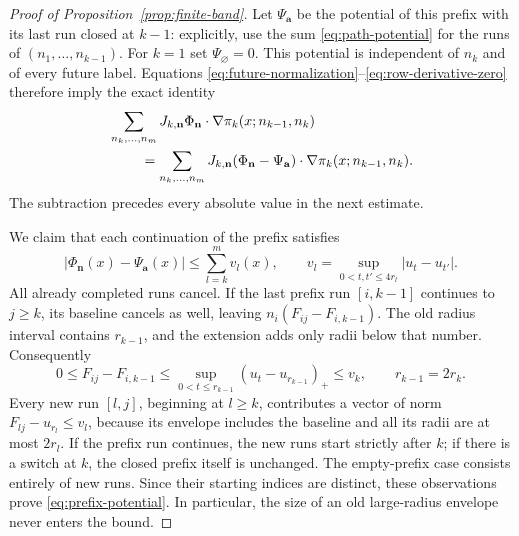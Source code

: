 \begin{proof}[Proof of Proposition~\ref{prop:finite-band}]
Let $\Psi_{\mathbf a}$ be the potential of this prefix with its
last run closed at $k-1$: explicitly, use the sum
\eqref{eq:path-potential} for the runs of $(n_1,\ldots,n_{k-1})$.
For $k=1$ set $\Psi_{\varnothing}=0$. This potential is
independent of $n_k$ and of every future label. Equations
\eqref{eq:future-normalization}--\eqref{eq:row-derivative-zero}
therefore imply the exact identity
\begin{align}
 &\sum_{n_k,\ldots,n_m}
        J_{k,\mathbf n}\Phi_{\mathbf n}\cdot
                  \nabla\pi_k(x;n_{k-1},n_k)\notag\\
 &\hspace{8mm}=
   \sum_{n_k,\ldots,n_m}J_{k,\mathbf n}
        (\Phi_{\mathbf n}-\Psi_{\mathbf a})\cdot
                  \nabla\pi_k(x;n_{k-1},n_k).
 \label{eq:prefix-subtraction}
\end{align}
The subtraction precedes every absolute value in the next estimate.

We claim that each continuation of the prefix satisfies
\begin{equation}\label{eq:prefix-potential}
 |\Phi_{\mathbf n}(x)-\Psi_{\mathbf a}(x)|
       \le\sum_{l=k}^m v_l(x),
 \qquad v_l=\sup_{0<t,t'\le4r_l}|u_t-u_{t'}|.
\end{equation}
All already completed runs cancel. If the last prefix run
$[i,k-1]$ continues to $j\ge k$, its baseline cancels as well,
leaving $n_i(F_{ij}-F_{i,k-1})$. The old radius interval contains
$r_{k-1}$, and the extension adds only radii below that number.
Consequently
\[
 0\le F_{ij}-F_{i,k-1}
 \le\sup_{0<t\le r_{k-1}}(u_t-u_{r_{k-1}})_+
 \le v_k,
 \qquad r_{k-1}=2r_k.
\]
Every new run $[l,j]$, beginning at $l\ge k$, contributes a vector
of norm $F_{lj}-u_{r_l}\le v_l$, because its envelope includes
the baseline and all its radii are at most $2r_l$. If the prefix
run continues, the new runs start strictly after $k$; if there
is a switch at $k$, the closed prefix itself is unchanged. The
empty-prefix case consists entirely of new runs. Since their
starting indices are distinct, these observations prove
\eqref{eq:prefix-potential}. In particular, the size of an old
large-radius envelope never enters the bound.


\end{proof}
